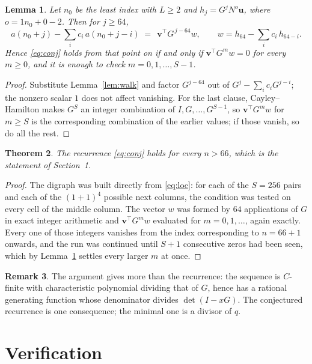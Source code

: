 \documentclass[11pt,a4paper]{article}
\theoremstyle{plain}
\newtheorem{theorem}{Theorem}
\newtheorem{lemma}[theorem]{Lemma}
\theoremstyle{definition}
\newtheorem{remark}[theorem]{Remark}
\begin{document}
\begin{lemma}\label{lem:crit}
Let $n_0$ be the least index with $L\ge2$ and $h_j=G^{j}N^{o}\mathbf{u}$, where
$o=1n_0+0-2$. Then for $j\ge64$,
\[
a(n_0+j)-\sum_i c_i\,a(n_0+j-i)\;=\;\,\mathbf{v}^{\!\top}G^{\,j-64}w,
\qquad w=h_{64}-\sum_i c_i\,h_{64-i} .
\]
Hence \eqref{eq:conj} holds from that point on if and only if
$\mathbf{v}^{\!\top}G^{m}w=0$ for every $m\ge0$, and it is enough to check
$m=0,1,\dots,S-1$.
\end{lemma}

\begin{proof}
Substitute Lemma~\ref{lem:walk} and factor $G^{j-64}$ out of
$G^{j}-\sum_ic_iG^{j-i}$; the nonzero scalar $1$ does not affect
vanishing. For the last clause, Cayley--Hamilton makes $G^{S}$ an integer combination of
$I,G,\dots,G^{S-1}$, so $\mathbf{v}^{\!\top}G^{m}w$ for $m\ge S$ is the corresponding
combination of the earlier values; if those vanish, so do all the rest.
\end{proof}

\begin{theorem}
The recurrence \eqref{eq:conj} holds for every $n>66$, which is the statement of
Section~1.
\end{theorem}

\begin{proof}
The digraph was built directly from \eqref{eq:loc}: for each of the $S=256$ pairs and each
of the $(1+1)^{4}$ possible next columns, the condition was tested on every cell of
the middle column. The vector $w$ was formed by $64$ applications of $G$ in exact integer
arithmetic and $\mathbf{v}^{\!\top}G^{m}w$ evaluated for $m=0,1,\dots$, again exactly.
Every one of those integers vanishes from the index corresponding to $n=66+1$ onwards,
and the run was continued until $S+1$ consecutive zeros had been seen, which by
Lemma~\ref{lem:crit} settles every larger $m$ at once.
\end{proof}

\begin{remark}
The argument gives more than the recurrence: the sequence is $C$-finite with characteristic
polynomial dividing that of $G$, hence has a rational generating function whose denominator
divides $\det(I-xG)$. The conjectured recurrence is one consequence; the minimal one is a
divisor of $q$.
\end{remark}

\section{Verification}
\end{document}
